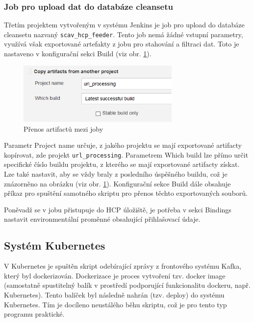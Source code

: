 \documentclass[thesis=M,czech,hidelinks]{FITthesis}[2013/05/06]
\begin{document}
\subsubsection{Job pro upload dat do databáze cleansetu}
Třetím projektem vytvořeným v systému Jenkins je job pro upload do databáze cleansetu nazvaný \texttt{scav_hcp_feeder}. Tento job nemá žádné vstupní parametry, využívá však exportované artefakty z jobu pro stahování a filtraci dat. Toto je nastaveno v konfigurační sekci Build (viz obr. \ref{fig:jenkins_artifacts}). 

\begin{figure}[h]
	\centering
	\includegraphics[width=8cm]{pictures/jenkins_artifacts.png}
	\caption{Přenos artifactů mezi joby}
	\label{fig:jenkins_artifacts}
\end{figure}

Parametr Project name určuje, z jakého projektu se mají exportované artifacty kopírovat, zde projekt \texttt{url_processing}. Parametrem Which build lze přímo určit specifické číslo buildu projektu, z kterého se mají exportované artifacty získat. Lze také nastavit, aby se vždy braly z posledního úspěšného buildu, což je znázorněno na obrázku (viz obr. \ref{fig:jenkins_artifacts}). Konfigurační sekce Build dále obsahuje příkaz pro spuštění samotného skriptu pro přenos těchto exportovaných souborů. 

Poněvadž se v jobu přistupuje do HCP úložiště, je potřeba v sekci Bindings nastavit environmentální proměnné obsahující přihlašovací údaje.



\subsection{Systém Kubernetes}\label{sec:luft}
V Kubernetes je spuštěn skript odebírající zprávy z frontového systému Kafka, který byl dockerizován. Dockerizace je proces vytvoření tzv. docker image (samostatně spustitelný balík v prostředí podporující funkcionalitu dockeru, např. Kubernetes). Tento balíček byl následně nahrán (tzv. deploy) do systému Kubernetes. Tím je docíleno neustálého běhu skriptu, což je pro tento typ programu praktické.
\end{document}
